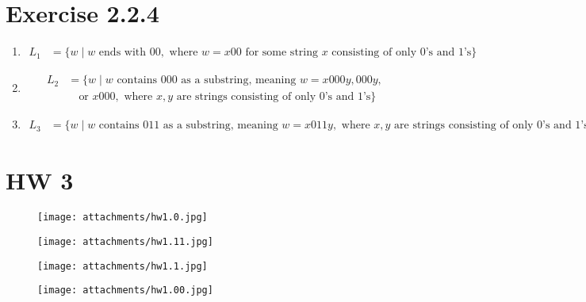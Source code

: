 \documentclass{article}
\theoremstyle{theorem}
\theoremstyle{definition}
\theoremstyle{remark}
\begin{document}
\section*{Exercise 2.2.4}


\begin{enumerate}
    \item \begin{align*}
        L_1 &= \{ w \mid w \text{ ends with } 00, \text{ where } w = x00 \text{ for some string } x \text{ consisting of only 0's and 1's} \}
    \end{align*}

    \item \begin{align*}
        L_2 &= \{ w \mid w \text{ contains } 000 \text{ as a substring, meaning } w = x000y, 000y, \\
        &\quad \text{or } x000, \text{ where } x, y \text{ are strings consisting of only 0's and 1's} \}
    \end{align*}

    \item \begin{align*}
        L_3 &= \{ w \mid w \text{ contains } 011 \text{ as a substring, meaning } w = x011y, \text{ where } x, y \text{ are strings consisting of only 0's and 1's} \}
    \end{align*}
\end{enumerate}


\section*{HW 3}

\begin{figure}[H]
    \centering
    \texttt{[image: attachments/hw1.0.jpg]} %
\end{figure}

\begin{figure}[H]
    \centering
    \texttt{[image: attachments/hw1.11.jpg]} %
\end{figure}

\begin{figure}[H]
    \centering
    \texttt{[image: attachments/hw1.1.jpg]} %
\end{figure}

\begin{figure}[H]
    \centering
    \texttt{[image: attachments/hw1.00.jpg]} %
\end{figure}
\end{document}
